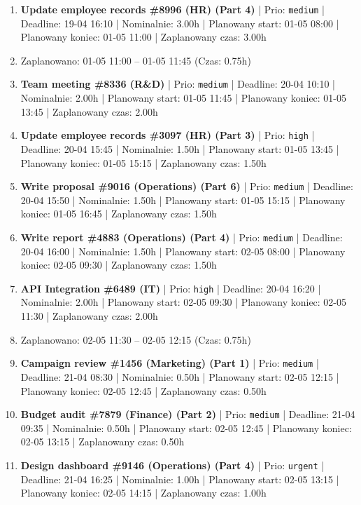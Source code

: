 {\begin{enumerate}
  \item [\textbf{14655}] \textbf{Update employee records \#8996 (HR) (Part 4)} | Prio: \texttt{medium} | Deadline: 19-04 16:10 | Nominalnie: 3.00h | Planowany start: 01-05 08:00 | Planowany koniec: 01-05 11:00 | Zaplanowany czas: 3.00h
  \item [\textbf{PRZERWA}] Zaplanowano: 01-05 11:00 -- 01-05 11:45 (Czas: 0.75h)
  \item [\textbf{14649}] \textbf{Team meeting \#8336 (R\&D)} | Prio: \texttt{medium} | Deadline: 20-04 10:10 | Nominalnie: 2.00h | Planowany start: 01-05 11:45 | Planowany koniec: 01-05 13:45 | Zaplanowany czas: 2.00h
  \item [\textbf{14621}] \textbf{Update employee records \#3097 (HR) (Part 3)} | Prio: \texttt{high} | Deadline: 20-04 15:45 | Nominalnie: 1.50h | Planowany start: 01-05 13:45 | Planowany koniec: 01-05 15:15 | Zaplanowany czas: 1.50h
  \item [\textbf{14662}] \textbf{Write proposal \#9016 (Operations) (Part 6)} | Prio: \texttt{medium} | Deadline: 20-04 15:50 | Nominalnie: 1.50h | Planowany start: 01-05 15:15 | Planowany koniec: 01-05 16:45 | Zaplanowany czas: 1.50h
  \item [\textbf{14651}] \textbf{Write report \#4883 (Operations) (Part 4)} | Prio: \texttt{medium} | Deadline: 20-04 16:00 | Nominalnie: 1.50h | Planowany start: 02-05 08:00 | Planowany koniec: 02-05 09:30 | Zaplanowany czas: 1.50h
  \item [\textbf{14620}] \textbf{API Integration \#6489 (IT)} | Prio: \texttt{high} | Deadline: 20-04 16:20 | Nominalnie: 2.00h | Planowany start: 02-05 09:30 | Planowany koniec: 02-05 11:30 | Zaplanowany czas: 2.00h
  \item [\textbf{PRZERWA}] Zaplanowano: 02-05 11:30 -- 02-05 12:15 (Czas: 0.75h)
  \item [\textbf{14653}] \textbf{Campaign review \#1456 (Marketing) (Part 1)} | Prio: \texttt{medium} | Deadline: 21-04 08:30 | Nominalnie: 0.50h | Planowany start: 02-05 12:15 | Planowany koniec: 02-05 12:45 | Zaplanowany czas: 0.50h
  \item [\textbf{14644}] \textbf{Budget audit \#7879 (Finance) (Part 2)} | Prio: \texttt{medium} | Deadline: 21-04 09:35 | Nominalnie: 0.50h | Planowany start: 02-05 12:45 | Planowany koniec: 02-05 13:15 | Zaplanowany czas: 0.50h
  \item [\textbf{14606}] \textbf{Design dashboard \#9146 (Operations) (Part 4)} | Prio: \texttt{urgent} | Deadline: 21-04 16:25 | Nominalnie: 1.00h | Planowany start: 02-05 13:15 | Planowany koniec: 02-05 14:15 | Zaplanowany czas: 1.00h
\end{enumerate}
}

